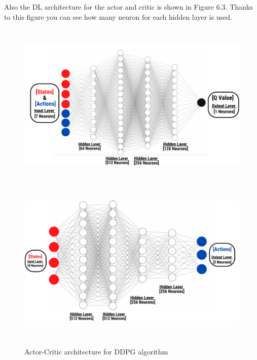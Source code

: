\documentclass[12pt,twoside,a4]{mwbk}
\begin{document}
\noindent Also the DL architecture for the actor and critic is shown in Figure 6.3. Thanks to this figure you can see how many neuron for each hidden layer is used.
\newpage
\begin{figure}[h]
    \centering
    \includegraphics[width=16cm, height=8cm]{actor.png}
    \includegraphics[width=16cm, height=8cm]{critic.png}
    \caption{Actor-Critic architecture for DDPG algorithm}
\end{figure}
\end{document}
